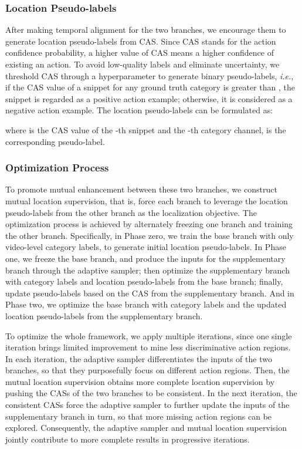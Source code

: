 \documentclass[journal]{IEEEtran}
\begin{document}
\subsubsection{\textbf{Location Pseudo-labels}}
After making temporal alignment for the two branches, we encourage them to generate location pseudo-labels from CAS. Since CAS stands for the action confidence probability, a higher value of CAS means a higher confidence of existing an action. To avoid low-quality labels and eliminate uncertainty, we threshold CAS through a hyperparameter  to generate binary pseudo-labels, \emph{i.e.}, if the CAS value of a snippet for any ground truth category is greater than , the snippet is regarded as a positive action example; otherwise, it is considered as a negative action example. The location pseudo-labels can be formulated as:

where  is the CAS value of the -th snippet and the -th category channel,  is the corresponding pseudo-label.




\subsubsection{\textbf{Optimization Process}}
To promote mutual enhancement between these two branches, we construct mutual location supervision, that is, force each branch to leverage the location pseudo-labels from the other branch as the localization objective. The optimization process is achieved by alternately freezing one branch and training the other branch. Specifically, in Phase zero, we train the base branch with only video-level category labels, to generate initial location pseudo-labels. In Phase one, we freeze the base branch, and produce the inputs for the supplementary branch through the adaptive sampler; then optimize the supplementary branch with category labels and location pseudo-labels from the base branch; finally, update pseudo-labels based on the CAS from the supplementary branch. And in Phase two, we optimize the base branch with category labels and the updated location pseudo-labels from the supplementary branch.



To optimize the whole framework, we apply multiple iterations, since one single iteration brings limited improvement to mine less discriminative action regions. In each iteration, the adaptive sampler differentiates the inputs of the two branches, so that they purposefully focus on different action regions. Then, the mutual location supervision obtains more complete location supervision by pushing the CASs of the two branches to be consistent. In the next iteration, the consistent CASs force the adaptive sampler to further update the inputs of the supplementary branch in turn, so that more missing action regions can be explored. Consequently, the adaptive sampler and mutual location supervision jointly contribute to more complete results in progressive iterations.
\end{document}

